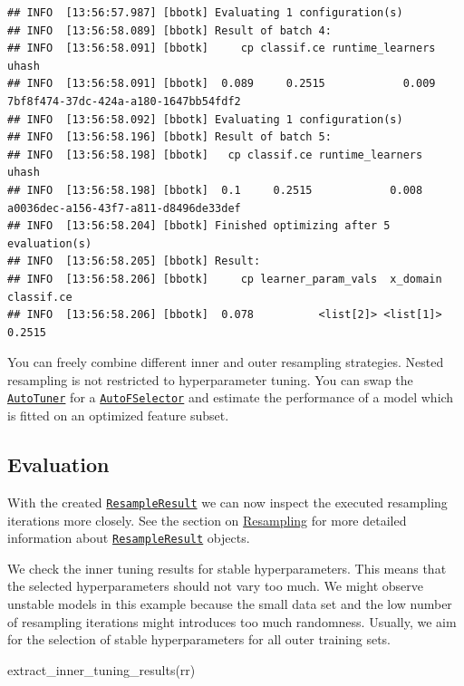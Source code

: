 \documentclass[
]{scrbook}
\newenvironment{Shaded}{\begin{snugshade}}{\end{snugshade}}
\newcommand{\FunctionTok}[1]{\textcolor[rgb]{0.00,0.00,0.00}{#1}}
\newcommand{\NormalTok}[1]{#1}
\renewenvironment{Shaded} {\begin{snugshade}\small} {\end{snugshade}}
\begin{document}
\begin{verbatim}
## INFO  [13:56:57.987] [bbotk] Evaluating 1 configuration(s) 
## INFO  [13:56:58.089] [bbotk] Result of batch 4: 
## INFO  [13:56:58.091] [bbotk]     cp classif.ce runtime_learners                                uhash 
## INFO  [13:56:58.091] [bbotk]  0.089     0.2515            0.009 7bf8f474-37dc-424a-a180-1647bb54fdf2 
## INFO  [13:56:58.092] [bbotk] Evaluating 1 configuration(s) 
## INFO  [13:56:58.196] [bbotk] Result of batch 5: 
## INFO  [13:56:58.198] [bbotk]   cp classif.ce runtime_learners                                uhash 
## INFO  [13:56:58.198] [bbotk]  0.1     0.2515            0.008 a0036dec-a156-43f7-a811-d8496de33def 
## INFO  [13:56:58.204] [bbotk] Finished optimizing after 5 evaluation(s) 
## INFO  [13:56:58.205] [bbotk] Result: 
## INFO  [13:56:58.206] [bbotk]     cp learner_param_vals  x_domain classif.ce 
## INFO  [13:56:58.206] [bbotk]  0.078          <list[2]> <list[1]>     0.2515
\end{verbatim}

You can freely combine different inner and outer resampling strategies.
Nested resampling is not restricted to hyperparameter tuning.
You can swap the \href{https://mlr3tuning.mlr-org.com/reference/AutoTuner.html}{\texttt{AutoTuner}} for a \href{https://mlr3fselect.mlr-org.com/reference/AutoFSelector.html}{\texttt{AutoFSelector}} and estimate the performance of a model which is fitted on an optimized feature subset.

\hypertarget{nested-resamp-eval}{%
\subsection{Evaluation}\label{nested-resamp-eval}}

With the created \href{https://mlr3.mlr-org.com/reference/ResampleResult.html}{\texttt{ResampleResult}} we can now inspect the executed resampling iterations more closely.
See the section on \protect\hyperlink{resampling}{Resampling} for more detailed information about \href{https://mlr3.mlr-org.com/reference/ResampleResult.html}{\texttt{ResampleResult}} objects.

We check the inner tuning results for stable hyperparameters.
This means that the selected hyperparameters should not vary too much.
We might observe unstable models in this example because the small data set and the low number of resampling iterations might introduces too much randomness.
Usually, we aim for the selection of stable hyperparameters for all outer training sets.

\begin{Shaded}
\begin{Highlighting}[]
\FunctionTok{extract\_inner\_tuning\_results}\NormalTok{(rr)}
\end{Highlighting}
\end{Shaded}
\end{document}
